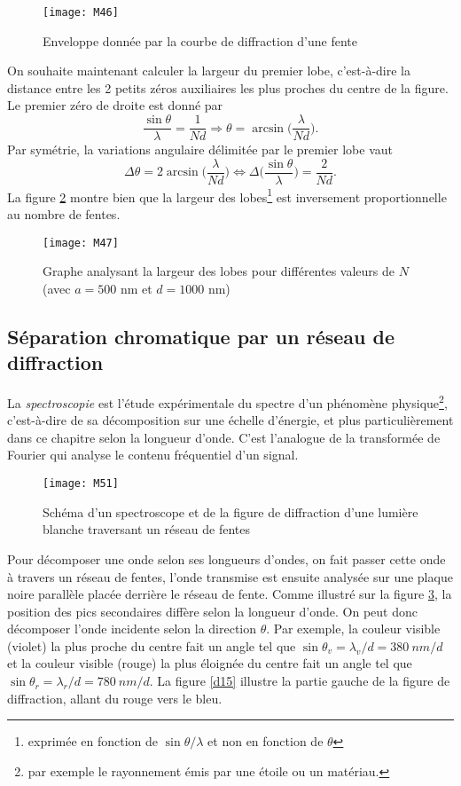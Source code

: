 \begin{figure}[h!]
    \centering
    \texttt{[image: M46]}
    \caption{Enveloppe donnée par la courbe de diffraction d'une fente}
    \label{d13}
\end{figure}

\noindent On souhaite maintenant calculer la largeur du premier lobe, c'est-à-dire la distance entre les 2 petits zéros auxiliaires les plus proches du centre de la figure. Le premier zéro de droite est donné par
$$
    \frac{\sin\theta}{\lambda}=\frac{1}{Nd}\Longrightarrow \theta=\arcsin\Big(\frac{\lambda}{Nd}\Big).
$$
Par symétrie, la variations angulaire délimitée par le premier lobe vaut
$$
    \Delta\theta=2\arcsin\Big(\frac{\lambda}{Nd}\Big) \Longleftrightarrow \Delta\Big(\frac{\sin\theta}{\lambda}\Big)=\frac{2}{Nd}.
$$
La figure \ref{d14} montre bien que la largeur des lobes\footnote{exprimée en fonction de $\sin\theta/\lambda$ et non en fonction de $\theta$} est inversement proportionnelle au nombre de fentes.

\begin{figure}[h!]
    \centering
    \texttt{[image: M47]}
    \caption{Graphe analysant la largeur des lobes pour différentes valeurs de $N$ (avec $a=500$ nm et $d=1000$ nm)}
    \label{d14}
\end{figure}

\subsection{Séparation chromatique par un réseau de diffraction}

La \textit{spectroscopie} est l'étude expérimentale du spectre d'un phénomène physique\footnote{par exemple le rayonnement émis par une étoile ou un matériau.}, c'est-à-dire de sa décomposition sur une échelle d'énergie, et plus particulièrement dans ce chapitre selon la longueur d'onde. C'est l'analogue de la transformée de Fourier qui analyse le contenu fréquentiel d'un signal.\\

\begin{figure}[h!]
    \centering
    \texttt{[image: M51]}
    \caption{Schéma d'un spectroscope et de la figure de diffraction d'une lumière blanche traversant un réseau de fentes}
    \label{d16}
\end{figure}

\noindent Pour décomposer une onde selon ses longueurs d'ondes, on fait passer cette onde à travers un réseau de fentes, l'onde transmise est ensuite analysée sur une plaque noire parallèle placée derrière le réseau de fente. Comme illustré sur la figure \ref{d16}, la position des pics secondaires diffère selon la longueur d'onde. On peut donc décomposer l'onde incidente selon la direction $\theta$. Par exemple, la couleur visible (violet) la plus proche du centre fait un angle tel que $\sin\theta_v=\lambda_v/d=380\:nm/d$ et la couleur visible (rouge) la plus éloignée du centre fait un angle tel que $\sin\theta_r=\lambda_r/d=780\:nm/d$. La figure \ref{d15} illustre la partie gauche de la figure de diffraction, allant du rouge vers le bleu.\\

